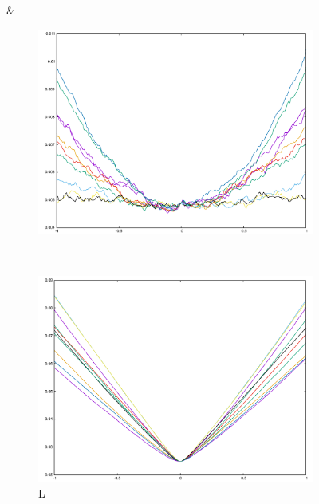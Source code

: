 {\begin{figure}[H]
\begin{subfigure}{.33\textwidth}
\end{subfigure}&
\begin{subfigure}{.33\textwidth}
	\includegraphics[width=\linewidth]{fig/ajherr/t2/S_chi.pdf}
\end{subfigure}\\
\begin{subfigure}{.33\textwidth}
	\includegraphics[width=\linewidth]{fig/ajherr/t2/L_mae.pdf}
	\caption{L}
\end{subfigure}%
\begin{subfigure}{.33\textwidth}

\end{subfigure}
\end{figure}}
